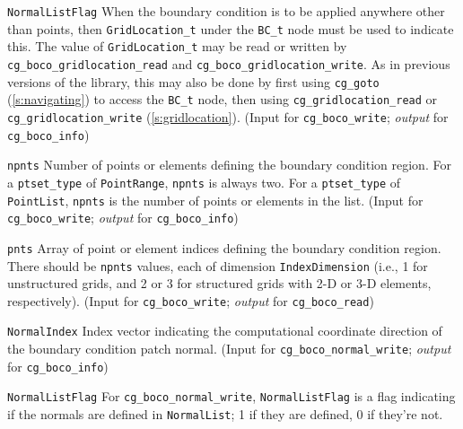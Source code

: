 \begin{Ventryi}{\texttt{NormalListFlag}}
      When the boundary condition is to be applied anywhere other than points,
      then \texttt{GridLocation\_t} under the \texttt{BC\_t} node must
      be used to indicate this.
      The value of \texttt{GridLocation\_t} may be read or written by
      \texttt{cg\_boco\_gridlocation\_read} and
      \texttt{cg\_boco\_gridlocation\_write}.
      As in previous versions of the library, this may also be done by
      first using \texttt{cg\_goto} (\autoref{s:navigating})
      to access the \texttt{BC\_t} node, then using
      \texttt{cg\_gridlocation\_read} or
      \texttt{cg\_gridlocation\_write} (\autoref{s:gridlocation}).
      (\textcolor{input}{Input} for \texttt{cg\_boco\_write};
      \textcolor{output}{\textit{output}} for \texttt{cg\_boco\_info})
\item [\texttt{npnts}]
      Number of points or elements defining the boundary
      condition region.
      For a \texttt{ptset\_type} of \texttt{PointRange},
      \texttt{npnts} is always two.
      For a \texttt{ptset\_type} of \texttt{PointList},
      \texttt{npnts} is the number of points or elements in the list.
      (\textcolor{input}{Input} for \texttt{cg\_boco\_write};
      \textcolor{output}{\textit{output}} for \texttt{cg\_boco\_info})
\item [\texttt{pnts}]
      Array of point or element indices defining the boundary condition
      region.
      There should be \texttt{npnts} values, each of dimension
      \texttt{IndexDimension} (i.e., 1 for unstructured grids,
      and 2 or 3 for structured grids with 2-D or 3-D elements,
      respectively).
      (\textcolor{input}{Input} for \texttt{cg\_boco\_write};
      \textcolor{output}{\textit{output}} for \texttt{cg\_boco\_read})
\item [\texttt{NormalIndex}]
      Index vector indicating the computational coordinate direction
      of the boundary condition patch normal.
      (\textcolor{input}{Input} for \texttt{cg\_boco\_normal\_write};
      \textcolor{output}{\textit{output}} for \texttt{cg\_boco\_info})
\item [\texttt{NormalListFlag}]
      For \texttt{cg\_boco\_normal\_write}, \texttt{NormalListFlag} is a
      flag indicating if the normals are defined in \texttt{NormalList};
      1 if they are defined, 0 if they're not.


\end{Ventryi}
